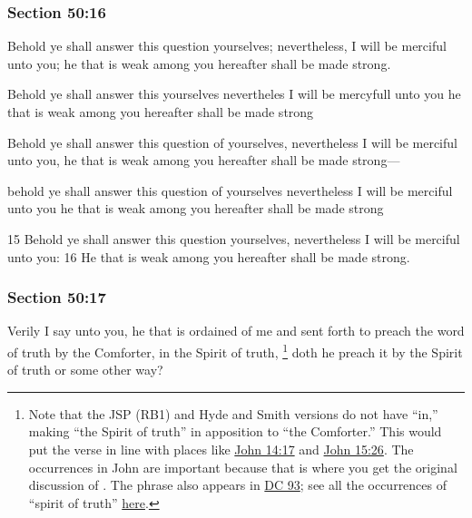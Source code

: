 	\subsubsection{Section 50:16} %
		\label{DC50-16}

		Behold ye shall answer this question yourselves; nevertheless, I will be merciful unto you; he that is weak among you hereafter shall be made strong.

		\begin{framed}
		\scriptsize
			\begin{compactdesc}
				\item[JSP] Behold ye shall answer this yourselves nevertheles I will be mercyfull unto you he that is weak among you hereafter shall be made strong
				\item[Gilbert] Behold ye shall answer this question of yourselves, nevertheless I will be merciful unto you, he that is weak among you hereafter shall be made strong---
				\item[Hyde and Smith] behold ye shall answer this question of yourselves nevertheless I will be merciful unto you he that is weak among you hereafter shall be made strong
				\item[BC] 15 Behold ye shall answer this question yourselves, nevertheless I will be merciful unto you: 16 He that is weak among you hereafter shall be made strong.
			\end{compactdesc}
		\end{framed}

	\subsubsection{Section 50:17} %
		\label{DC50-17}

		Verily I say unto you, he that is ordained of me and sent forth to preach the word of truth by the Comforter, in the Spirit of truth,%
			\footnote{%
				Note that the JSP (RB1) and Hyde and Smith versions do not have ``in,'' making ``the Spirit of truth'' in apposition to ``the Comforter.'' This would put the verse in line with places like \hyperref[JOHN-14-17]{John 14:17} and \hyperref[JOHN-15-26]{John 15:26}. The occurrences in John are important because that is where you get the original discussion of \hyperref[PARAKLETOS]{}. The phrase also appears in \hyperref[DC93]{DC 93}; see all the occurrences of ``spirit of truth'' \hyperref[SPIRIT-PHRASES]{here}.
				}
		doth he preach it by the Spirit of truth or some other way?

